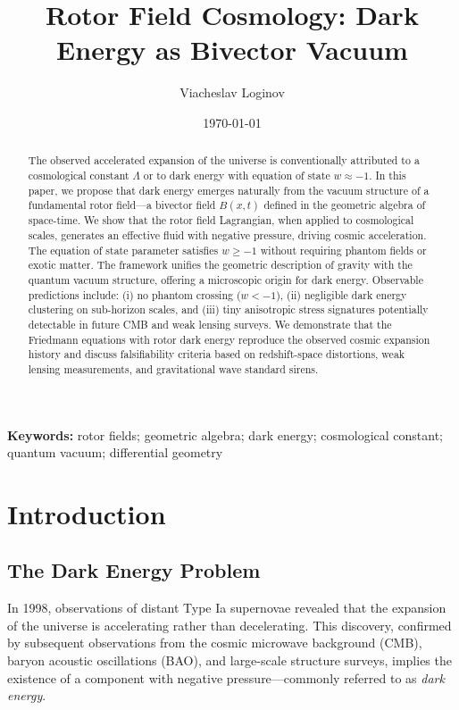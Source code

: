 \documentclass[11pt,a4paper]{article}
\title{Rotor Field Cosmology: Dark Energy as Bivector Vacuum}
\author[1]{Viacheslav Loginov}
\affil[1]{Kyiv, Ukraine\\ \texttt{barthez.slavik@gmail.com}}
\date{\today} %
\numberwithin{equation}{section}
\theoremstyle{plain}
\theoremstyle{definition}
\theoremstyle{remark}
\newcommand{\keywords}{\textbf{Keywords:} rotor fields; geometric algebra; dark energy; cosmological constant; quantum vacuum; differential geometry}
\begin{document}
\maketitle

\begin{abstract}
The observed accelerated expansion of the universe is conventionally attributed to a cosmological constant $\Lambda$ or to dark energy with equation of state $w \approx -1$. In this paper, we propose that dark energy emerges naturally from the vacuum structure of a fundamental rotor field---a bivector field $B(x,t)$ defined in the geometric algebra of space-time. We show that the rotor field Lagrangian, when applied to cosmological scales, generates an effective fluid with negative pressure, driving cosmic acceleration. The equation of state parameter satisfies $w \geq -1$ without requiring phantom fields or exotic matter. The framework unifies the geometric description of gravity with the quantum vacuum structure, offering a microscopic origin for dark energy. Observable predictions include: (i) no phantom crossing ($w < -1$), (ii) negligible dark energy clustering on sub-horizon scales, and (iii) tiny anisotropic stress signatures potentially detectable in future CMB and weak lensing surveys. We demonstrate that the Friedmann equations with rotor dark energy reproduce the observed cosmic expansion history and discuss falsifiability criteria based on redshift-space distortions, weak lensing measurements, and gravitational wave standard sirens.
\end{abstract}

\keywords

\section{Introduction}
\label{sec:intro}

\subsection{The Dark Energy Problem}

In 1998, observations of distant Type Ia supernovae revealed that the expansion of the universe is accelerating rather than decelerating. This discovery, confirmed by subsequent observations from the cosmic microwave background (CMB), baryon acoustic oscillations (BAO), and large-scale structure surveys, implies the existence of a component with negative pressure---commonly referred to as \emph{dark energy}.
\end{document}
